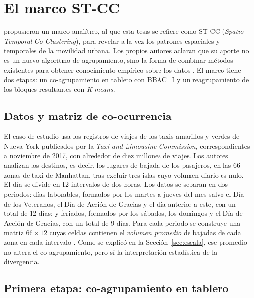 \section{El marco ST-CC}\label{sec:stcc}

\cite{Liu2021} propusieron un marco analítico, al que esta tesis se refiere como
ST-CC (\emph{Spatio-Temporal Co-Clustering}), para revelar a la vez los patrones
espaciales y temporales de la movilidad urbana. Los propios autores aclaran que su
aporte no es un nuevo algoritmo de agrupamiento, sino la forma de combinar métodos
existentes para obtener conocimiento empírico sobre los datos
\cite[Sec.~I]{Liu2021}. El marco tiene dos etapas: un co-agrupamiento en tablero
con BBAC\_I y un reagrupamiento de los bloques resultantes con \textit{K-means}.

\subsection{Datos y matriz de co-ocurrencia}

El caso de estudio usa los registros de viajes de los taxis amarillos y verdes de
Nueva York publicados por la \emph{Taxi and Limousine Commission}, correspondientes
a noviembre de 2017, con alrededor de diez millones de viajes. Los autores
analizan los destinos, es decir, los lugares de bajada de los pasajeros, en las
66 zonas de taxi de Manhattan, tras excluir tres islas cuyo volumen diario es
nulo. El día se divide en 12 intervalos de dos horas. Los datos se separan en dos
periodos: días laborables, formados por los martes a jueves del mes salvo el Día
de los Veteranos, el Día de Acción de Gracias y el día anterior a este, con un
total de 12 días; y feriados, formados por los sábados, los domingos y el Día de
Acción de Gracias, con un total de 9 días. Para cada periodo se construye una
matriz $66 \times 12$ cuyas celdas contienen el \emph{volumen promedio} de bajadas
de cada zona en cada intervalo \cite[Sec.~IV.A]{Liu2021}. Como se explicó en la
Sección~\ref{sec:escala}, ese promedio no altera el co-agrupamiento, pero sí la
interpretación estadística de la divergencia.

\subsection{Primera etapa: co-agrupamiento en tablero}

